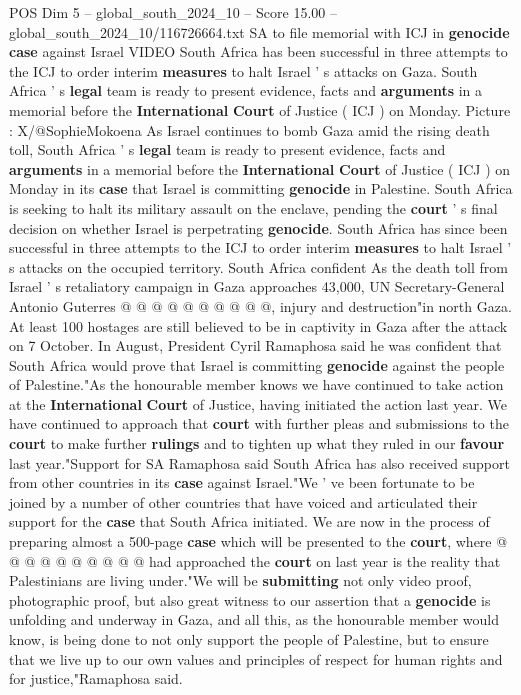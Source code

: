 \begin{textsample}{POS Dim 5 – global\_south\_2024\_10 – Score 15.00 – global\_south\_2024\_10/116726664.txt}  \label{ex:f5_pos_325}
SA to file memorial with ICJ in \textbf{genocide} \textbf{case} against Israel VIDEO South Africa has been successful in three attempts to the ICJ to order interim \textbf{measures} to halt Israel ' s attacks on Gaza.
South Africa ' s \textbf{legal} team is ready to present evidence, facts and \textbf{arguments} in a memorial before the \textbf{International} \textbf{Court} of Justice ( ICJ ) on Monday.
Picture : X/@SophieMokoena As Israel continues to bomb Gaza amid the rising death toll, South Africa ' s \textbf{legal} team is ready to present evidence, facts and \textbf{arguments} in a memorial before the \textbf{International} \textbf{Court} of Justice ( ICJ ) on Monday in its \textbf{case} that Israel is committing \textbf{genocide} in Palestine.
South Africa is seeking to halt its military assault on the enclave, pending the \textbf{court} ' s final decision on whether Israel is perpetrating \textbf{genocide}.
South Africa has since been successful in three attempts to the ICJ to order interim \textbf{measures} to halt Israel ' s attacks on the occupied territory.
South Africa confident As the death toll from Israel ' s retaliatory campaign in Gaza approaches 43,000, UN Secretary-General Antonio Guterres @ @ @ @ @ @ @ @ @ @, injury and destruction"in north Gaza.
At least 100 hostages are still believed to be in captivity in Gaza after the attack on 7 October.
In August, President Cyril Ramaphosa said he was confident that South Africa would prove that Israel is committing \textbf{genocide} against the people of Palestine."As the honourable member knows we have continued to take action at the \textbf{International} \textbf{Court} of Justice, having initiated the action last year.
We have continued to approach that \textbf{court} with further pleas and submissions to the \textbf{court} to make further \textbf{rulings} and to tighten up what they ruled in our \textbf{favour} last year."Support for SA Ramaphosa said South Africa has also received support from other countries in its \textbf{case} against Israel."We ' ve been fortunate to be joined by a number of other countries that have voiced and articulated their support for the \textbf{case} that South Africa initiated.
We are now in the process of preparing almost a 500-page \textbf{case} which will be presented to the \textbf{court}, where @ @ @ @ @ @ @ @ @ @ had approached the \textbf{court} on last year is the reality that Palestinians are living under."We will be \textbf{submitting} not only video proof, photographic proof, but also great witness to our assertion that a \textbf{genocide} is unfolding and underway in Gaza, and all this, as the honourable member would know, is being done to not only support the people of Palestine, but to ensure that we live up to our own values and principles of respect for human rights and for justice,"Ramaphosa said.

\end{textsample}
